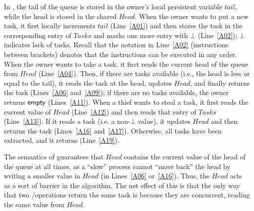 In \WFWSM, the tail of the queue is stored in the owner's local persistent variable \(tail\), while the head is stored in the shared \MaxReg \(Head\).  When the owner wants to put a new task, it first locally increments \(tail\) (Line~\ref{A01}) and then stores the task in the corresponding entry of \(Tasks\) and marks one more entry with \(\bot\) (Line~\ref{A02}); \(\bot\) indicates lack of tasks.  Recall that the notation in Line~\ref{A02} (instructions between brackets) denotes that the instructions can be executed in any order.  When the owner wants to take a task, it first reads the current head of the queue from \(Head\) (Line~\ref{A04}). Then, if there are tasks available (i.e., the head is less or equal to the tail), it reads the task at the head, updates \(Head\), and finally returns the task (Lines~\ref{A06} and~\ref{A09}); if there are no tasks available, the owner returns ${\sf \small empty}$ (Lines~\ref{A11}).  When a thief wants to steal a task, it first reads the current value of \(Head\) (Line~\ref{A12}) and then reads that entry of \(Tasks\) (Line~\ref{A13}).  If it reads a task (i.e. a non-\(\bot\) value), it updates \(Head\) and then returns the task (Lines~\ref{A16} and~\ref{A17}).  Otherwise, all tasks have been extracted, and it returns \epty (Line~\ref{A19}).

The semantics of \MaxW guarantees that $Head$ contains the current value of the head of the queue at all times, as a ``slow'' process cannot ``move back'' the head by writing a smaller value in \(Head\) (in Lines~\ref{A06} or~\ref{A16}).  Thus, the \MaxReg \(Head\) acts as a sort of barrier in the algorithm.  The net effect of this is that the only way that two \Take/\Steal operations return the same task is because they are concurrent, reading the same value from \(Head\).


